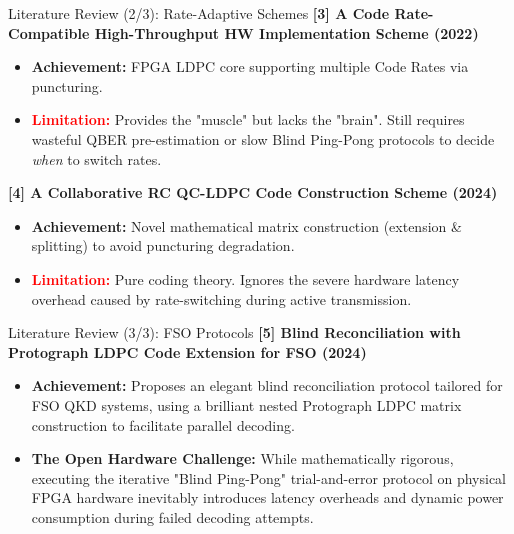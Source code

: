 \documentclass[t, aspectratio=169]{beamer}
\begin{document}
	\begin{frame}{Literature Review (2/3): Rate-Adaptive Schemes}
        \textbf{[3] A Code Rate-Compatible High-Throughput HW Implementation Scheme (2022)}
        \begin{itemize}
            \item \textbf{Achievement:} FPGA LDPC core supporting multiple Code Rates via puncturing.
            \item \textcolor{red}{\textbf{Limitation:}} Provides the "muscle" but lacks the "brain". Still requires wasteful QBER pre-estimation or slow Blind Ping-Pong protocols to decide \textit{when} to switch rates.
        \end{itemize}
        \vspace{0.8em}
        \textbf{[4] A Collaborative RC QC-LDPC Code Construction Scheme (2024)}
        \begin{itemize}
            \item \textbf{Achievement:} Novel mathematical matrix construction (extension \& splitting) to avoid puncturing degradation.
            \item \textcolor{red}{\textbf{Limitation:}} Pure coding theory. Ignores the severe hardware latency overhead caused by rate-switching during active transmission.
        \end{itemize}
	\end{frame}

	\begin{frame}{Literature Review (3/3): FSO Protocols}
        \textbf{[5] Blind Reconciliation with Protograph LDPC Code Extension for FSO (2024)}
        \begin{itemize}
            \item \textbf{Achievement:} Proposes an elegant blind reconciliation protocol tailored for FSO QKD systems, using a brilliant nested Protograph LDPC matrix construction to facilitate parallel decoding.
            \item \textbf{The Open Hardware Challenge:} While mathematically rigorous, executing the iterative "Blind Ping-Pong" trial-and-error protocol on physical FPGA hardware inevitably introduces latency overheads and dynamic power consumption during failed decoding attempts.
        \end{itemize}
	\end{frame}
\end{document}
